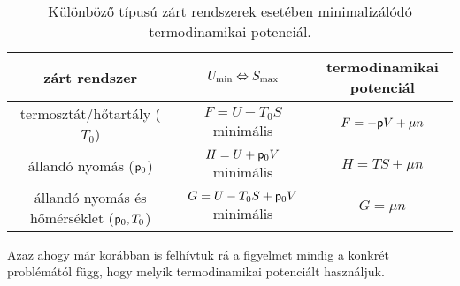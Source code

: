 \begin{table}[h!]
\centering
\begin{adjustbox}{width=1.15\textwidth, center=\textwidth}
\begin{tabular}{|c||c|c|} \hline
zárt rendszer & $U_{\textnormal{min}}\Leftrightarrow S_{\textnormal{max}}$ & termodinamikai potenciál\\ \hline\hline
termosztát/hőtartály ($T_0$) & $F=U-T_0S$ minimális & $F=-\mathsf p V+\mu n$\\ \hline
állandó nyomás ($\mathsf p_0$) & $H=U+\mathsf p_0 V$ minimális & $H=TS+\mu n$ \\ \hline
állandó nyomás és hőmérséklet ($\mathsf p_0,T_0$) & $G=U-T_0S+\mathsf p_0V$ minimális & $G=\mu n$\\ \hline
\end{tabular}
\end{adjustbox}
\caption{Különböző típusú zárt rendszerek esetében minimalizálódó termodinamikai potenciál.}
\label{tab:egyensuly}
\end{table}
Azaz ahogy már korábban is felhívtuk rá a figyelmet mindig a konkrét problémától függ, hogy melyik termodinamikai potenciált használjuk.
